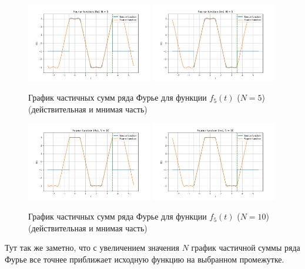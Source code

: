 \begin{figure}[ht!]
    \centering
    \includegraphics[width=0.49\textwidth]{media/plots/func_5_real_N_5.png}
    \includegraphics[width=0.49\textwidth]{media/plots/func_5_imag_N_5.png}
    \caption{График частичных сумм ряда Фурье для функции $f_5(t)$ ($N = 5$) (действительная и мнимая часть)}
    \label{fig:func_5_fourier_re_im_N_5}
\end{figure}

\begin{figure}[ht!]
    \centering
    \includegraphics[width=0.49\textwidth]{media/plots/func_5_real_N_10.png}
    \includegraphics[width=0.49\textwidth]{media/plots/func_5_imag_N_10.png}
    \caption{График частичных сумм ряда Фурье для функции $f_5(t)$ ($N = 10$) (действительная и мнимая часть)}
    \label{fig:func_5_fourier_re_im_N_10}
\end{figure}

Тут так же заметно, что с увеличением значения $N$ график частичной суммы ряда Фурье все точнее приближает исходную функцию на выбранном промежутке. 
